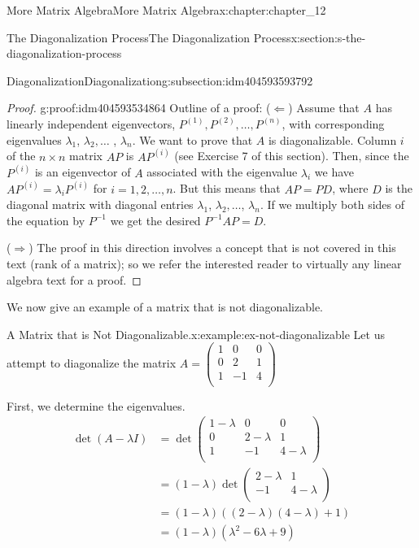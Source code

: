 \documentclass[twoside,10pt,]{book}
\numberwithin{equation}{section}
\begin{document}
\begin{chapterptx}{More Matrix Algebra}{}{More Matrix Algebra}{}{}{x:chapter:chapter_12}
\begin{sectionptx}{The Diagonalization Process}{}{The Diagonalization Process}{}{}{x:section:s-the-diagonalization-process}
\begin{subsectionptx}{Diagonalization}{}{Diagonalization}{}{}{g:subsection:idm404593593792}
\begin{proof}{}{g:proof:idm404593534864}
Outline of a proof: (\(\Longleftarrow\)) Assume that \(A\) has linearly independent eigenvectors, \(P^{(1)}, P^{(2)}, \ldots , P^{(n)}\), with corresponding eigenvalues \(\lambda_1\), \(\lambda_2, \ldots\) , \(\lambda _n\).   We want to prove that \(A\) is diagonalizable. Column \(i\) of the \(n \times n\) matrix \(A P\) is  \(A P^{(i)}\) (see Exercise 7 of this section). Then, since the \(P^{(i)}\) is an eigenvector of \(A\)  associated  with the eigenvalue \(\lambda _i\) we have \(A P^{(i)}= \lambda _iP^{(i)}\) for \(i = 1, 2, \dots , n\). But this means that \(A P = P D\), where \(D\) is the diagonal matrix with diagonal entries  \(\lambda_1\), \(\lambda_2,\ldots \), \(\lambda_n\).   If we multiply both sides of the equation by \(P^{-1}\) we get the desired \(P^{-1}A P = D\).%
\par
(\(\Longrightarrow \)) The proof in this direction involves a concept that is not covered in this text (rank of a matrix); so we refer the interested reader to virtually any linear algebra text for a proof.%
\end{proof}
We now give an example of a matrix that is not diagonalizable.%
\begin{example}{A Matrix that is Not Diagonalizable.}{x:example:ex-not-diagonalizable}%
Let us attempt to diagonalize the matrix \(A = \left(
\begin{array}{ccc}
1 & 0 & 0 \\
0 & 2 & 1 \\
1 & -1 & 4 \\
\end{array}
\right)\)%
\par
First, we determine the eigenvalues.%
\begin{equation*}
\begin{split}
\det (A-\lambda  I) &= \det  \left(
\begin{array}{ccc}
1-\lambda  & 0 & 0 \\
0 & 2-\lambda  & 1 \\
1 & -1 & 4-\lambda  \\
\end{array}
\right)\\
&= (1-\lambda) \det \left(
\begin{array}{cc}
2-\lambda  & 1 \\
-1 & 4-\lambda  \\
\end{array}
\right)\\
& = (1-\lambda )((2-\lambda )(4-\lambda )+1)\\
& = (1-\lambda )\left(\lambda ^2-6\lambda  +9\right)\\

\end{split}
\end{equation*}
\end{example}
\end{subsectionptx}
\end{sectionptx}
\end{chapterptx}
\end{document}

